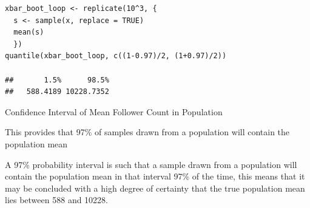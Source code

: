 \documentclass[11pt]{article}
\begin{document}
\begin{listing}[htbp]
\begin{verbatim}
xbar_boot_loop <- replicate(10^3, {
  s <- sample(x, replace = TRUE)
  mean(s)
  })
quantile(xbar_boot_loop, c((1-0.97)/2, (1+0.97)/2))

##       1.5%      98.5%
##   588.4189 10228.7352
\end{verbatim}
\caption{\label{orgf6e827d}Confidence Interval of Mean Follower Count in Population}
\end{listing}

This provides that 97\% of samples drawn from a population will contain the population mean

A 97\% probability interval is such that a sample drawn from a population will contain the population mean in that interval 97\% of the time, this means that it may be concluded with a high degree of certainty that the true population mean lies between 588 and 10228.
\end{document}
